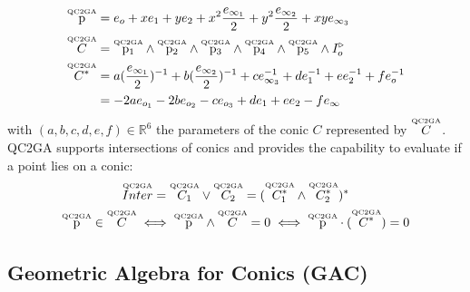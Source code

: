 \documentclass{birkjour}
\begin{document}
\begin{align}\displaystyle
\overset{\mbox{\tiny QC2GA}}{\mathrm{p}} &= e_o + x e_1 + y e_2 + x^2 \frac{ e_{\infty_1}}{2} + y^2 \frac{e_{\infty_2} }{2} + xy e_{\infty_3} \\
\overset{\mbox{\tiny QC2GA}}{C} &= \overset{\mbox{\tiny QC2GA}}{\mathrm{p}_1} \wedge \overset{\mbox{\tiny QC2GA}}{\mathrm{p}_2} \wedge \overset{\mbox{\tiny QC2GA}}{\mathrm{p}_3} \wedge \overset{\mbox{\tiny QC2GA}}{\mathrm{p}_4} \wedge \overset{\mbox{\tiny QC2GA}}{\mathrm{p}_5} \wedge I_o^\triangleright \\
\overset{\mbox{\tiny QC2GA}}{C^*}  &= a (\frac{e_{\infty_1}}{2})^{-1} +  b (\frac{e_{\infty_2}}{2})^{-1} + c e_{\infty_3}^{-1} + d e_1^{-1} + e e_2^{-1} + f e_o^{-1} \\
&= - 2 a e_{o_1} - 2 b e_{o_2} - c e_{o_3} + d e_1 + e e_2 - f e_\infty
\end{align}
with \((a,b,c,d,e,f)\in\mathbb{R}^6\) the parameters of the conic \(C\) represented by \(\overset{\mbox{\tiny QC2GA}}{C}\). QC2GA supports intersections of conics and provides the capability to evaluate if a point lies on a conic:
\begin{align} \displaystyle
\qcgaobject{Inter} = \qcgaobject{C_1} \vee \qcgaobject{C_2} = (\qcgaobject{C^*_1} \wedge \qcgaobject{C^*_2})^* \span \label{eq:antiwedge} \\ 
\qcgaobject{\mathrm{p}} \in \qcgaobject{C} &\iff \qcgaobject{\mathrm{p}}\wedge \qcgaobject{C} = 0 
\iff \qcgaobject{\mathrm{p}} \cdot (\qcgaobject{C^*}) = 0
\end{align}



\subsection{Geometric Algebra for Conics (GAC)}
\end{document}
